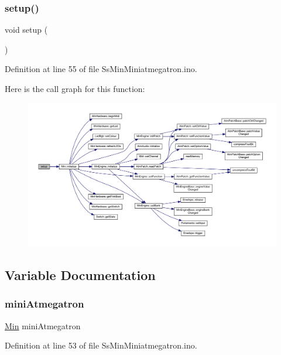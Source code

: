 \subsubsection{\texorpdfstring{setup()}{setup()}}
{\footnotesize\ttfamily void setup (\begin{DoxyParamCaption}{ }\end{DoxyParamCaption})}



Definition at line 55 of file Ss\+Min\+Miniatmegatron.\+ino.

Here is the call graph for this function\+:
\nopagebreak
\begin{figure}[H]
\begin{center}
\leavevmode
\includegraphics[width=350pt]{_ss_min_miniatmegatron_8ino_a4fc01d736fe50cf5b977f755b675f11d_cgraph}
\end{center}
\end{figure}


\subsection{Variable Documentation}
\mbox{\label{_ss_min_miniatmegatron_8ino_a75f390a8ad79e74fbf5ebf8f798e92e0}} 
\subsubsection{\texorpdfstring{mini\+Atmegatron}{miniAtmegatron}}
{\footnotesize\ttfamily \hyperlink{class_min}{Min} mini\+Atmegatron}



Definition at line 53 of file Ss\+Min\+Miniatmegatron.\+ino.


